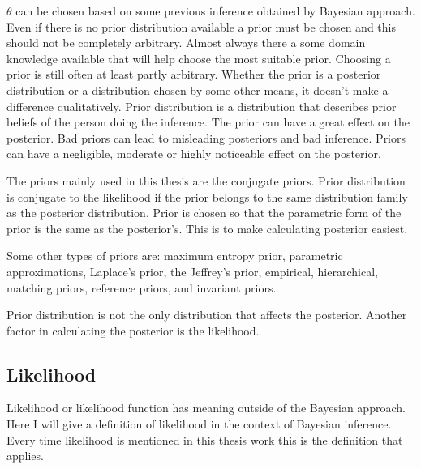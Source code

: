 $\theta$ can be chosen based on some previous inference obtained by Bayesian approach. Even if there is no prior distribution available a prior must be chosen and this should not be completely arbitrary. Almost always there a some domain knowledge available that will help choose the most suitable prior.\cite{Mcelreath2015StatisticalRA} Choosing a prior is still often at least partly arbitrary.\cite{Robert2007TheBC} Whether the prior is a posterior distribution or a distribution chosen by some other means, it doesn't make a difference qualitatively. Prior distribution is a distribution that describes prior beliefs of the person doing the inference.\cite{Lindley1990The1W} The prior can have a great effect on the posterior. Bad priors can lead to misleading posteriors and bad inference.\cite{Mcelreath2015StatisticalRA} Priors can have a negligible, moderate or highly noticeable effect on the posterior.\cite{Robert2007TheBC}

The priors mainly used in this thesis are the conjugate priors. Prior distribution is conjugate to the likelihood if the prior belongs to the same distribution family as the posterior distribution. Prior is chosen so that the parametric form of the prior is the same as the posterior's. This is to make calculating posterior easiest. \cite{SUGIYAMA2016185}

Some other types of priors are: maximum entropy prior, parametric approximations, Laplace’s prior, the Jeffrey's prior, empirical, hierarchical, matching priors, reference priors, and invariant priors. \cite{Robert2007TheBC}

Prior distribution is not the only distribution that affects the posterior. Another factor in calculating the posterior is the likelihood.

\subsection{Likelihood}\label{Likelihood}
Likelihood or likelihood function has meaning outside of the Bayesian approach. Here I will give a definition of likelihood in the context of Bayesian inference. Every time likelihood is mentioned in this thesis work this is the definition that applies. 

